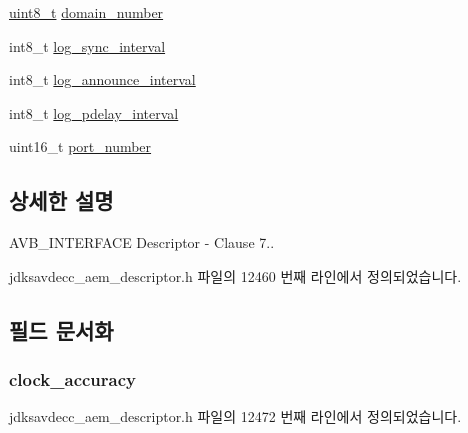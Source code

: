 \begin{DoxyCompactItemize}
\item 
\hyperlink{stdint_8h_aba7bc1797add20fe3efdf37ced1182c5}{uint8\+\_\+t} \hyperlink{structjdksavdecc__descriptor__avb__interface_a96702548f5b9222af26319c695764b29}{domain\+\_\+number}
\item 
int8\+\_\+t \hyperlink{structjdksavdecc__descriptor__avb__interface_a2d4950b4c6da4dfa67688dcaf6139c9d}{log\+\_\+sync\+\_\+interval}
\item 
int8\+\_\+t \hyperlink{structjdksavdecc__descriptor__avb__interface_a15bb50a04ecd3ec11563012afc7e24a7}{log\+\_\+announce\+\_\+interval}
\item 
int8\+\_\+t \hyperlink{structjdksavdecc__descriptor__avb__interface_a26544b553c0b251da8e632533f260a5d}{log\+\_\+pdelay\+\_\+interval}
\item 
uint16\+\_\+t \hyperlink{structjdksavdecc__descriptor__avb__interface_af0afa7bb85d49ac5ff873fad86a48ec5}{port\+\_\+number}
\end{DoxyCompactItemize}


\subsection{상세한 설명}
A\+V\+B\+\_\+\+I\+N\+T\+E\+R\+F\+A\+CE Descriptor -\/ Clause 7.. 

jdksavdecc\+\_\+aem\+\_\+descriptor.\+h 파일의 12460 번째 라인에서 정의되었습니다.



\subsection{필드 문서화}
\subsubsection[{\texorpdfstring{clock\+\_\+accuracy}{clock_accuracy}}]{ clock\+\_\+accuracy}\hypertarget{structjdksavdecc__descriptor__avb__interface_a708d6d971b6be997cf8d3e683951ceb0}{}\label{structjdksavdecc__descriptor__avb__interface_a708d6d971b6be997cf8d3e683951ceb0}


jdksavdecc\+\_\+aem\+\_\+descriptor.\+h 파일의 12472 번째 라인에서 정의되었습니다.

